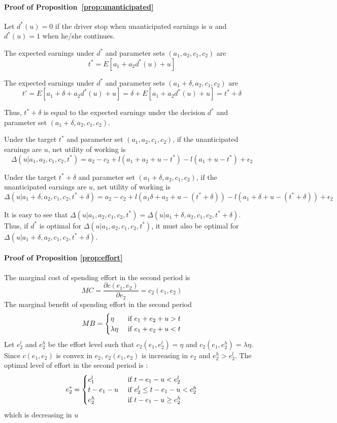 \documentclass[reviewmode]{restat}
\begin{document}
\begin{appendices}
\paragraph{Proof of Proposition~\ref{prop:unanticipated}} Let $d^*(u) = 0$ if the driver stop when unanticipated earnings is $u$ and  $d^*(u) = 1$ when he/she continues.

The expected earnings under $d^*$ and parameter sets $(a_1, a_2, c_1, c_2)$ are 
\[t^* = E[a_1 + a_2d^*(u) + u]\]

The expected earnings under $d^*$ and parameter sets $(a_1+\delta, a_2, c_1, c_2)$ are
\[t' = E[a_1 + \delta + a_2d^*(u) + u] = \delta +E[a_1  + a_2d^*(u) + u] = t^* + \delta\]

Thus, $t^* + \delta$ is equal to the expected earnings under the decision $d^*$ and parameter set $(a_1+\delta, a_2, c_1, c_2)$.

Under the target $t^*$ and parameter set $(a_1, a_2, c_1, c_2)$, if the unanticipated earnings are $u$, net utility of working is 
\[\Delta(u|a_1, a_2, c_1, c_2, t^*) = a_2 - c_2 + l(a_1 + a_2 + u - t^*) -  l(a_1 + u - t^*) + \epsilon_2 \]


Under the target $t^*+\delta$ and parameter set $(a_1+\delta, a_2, c_1, c_2)$, if the unanticipated earnings are $u$, net utility of working is 
\[\Delta(u|a_1+\delta, a_2, c_1, c_2, t^*+\delta) = a_2  - c_2 + l(a_1 \delta + a_2 + u - (t^*+\delta)) -  l(a_1 + \delta + u - (t^*+\delta)) + \epsilon_2 \]

It is easy to see that \(\Delta(u|a_1, a_2, c_1, c_2, t^*)  = \Delta(u|a_1+\delta, a_2, c_1, c_2, t^*+\delta)\). Thus, if $d^*$ is optimal for \(\Delta(u|a_1, a_2, c_1, c_2, t^*) \), it must also be optimal for \(\Delta(u|a_1+\delta, a_2, c_1, c_2, t^*+\delta) \).


\paragraph{Proof of Proposition \ref{prop:effort}} The marginal cost of spending effort in the second period is 
\[MC = \frac{\partial c(e_1, e_2)}{\partial e_2} = c_2(e_1, e_2)\]
The marginal benefit of spending effort in the second period 
\[MB = \begin{cases}\eta &\hbox{ if } e_1+e_2+u > t\\\lambda\eta &\hbox{ if } e_1+e_2+u < t\end{cases}\]
Let $e_2^l$ and $e_2^h$ be the effort level such that $c_2(e_1, e_2^l) = \eta$ and $c_2(e_1, e_2^h) = \lambda\eta$. Since $c(e_1, e_2)$ is convex in $e_2$, $c_2(e_1, e_2)$ is increasing in $e_2$ and $e_2^h > e_2^l$.  The optimal level of effort in the second period is :
\[e_2^* = \begin{cases} e_1^l &\hbox{ if } t-e_1-u < e_2^l \\ t-e_1-u &\hbox{ if } e_2^l \leq t-e_1-u < e_2^h \\ e_2^h &\hbox{ if } t-e_1-u \geq e_2^h \end{cases}\]
which is decreasing in $u$



\end{appendices}
\end{document}
